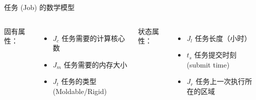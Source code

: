 \begin{frame}{任务 (Job) 的数学模型}

    \begin{columns}


        固有属性：

        \begin{itemize}
            \item $J_c$ 任务需要的计算核心数
            \item $J_m$ 任务需要的内存大小
            \item $J_t$ 任务的类型 (Moldable/Rigid)
        \end{itemize}


        状态属性：

        \begin{itemize}
            \item $J_l$ 任务长度（小时）
            \item $t_s$ 任务提交时刻 (submit time)
            \item $J_r$ 任务上一次执行所在的区域
        \end{itemize}

    \end{columns}

\end{frame}


